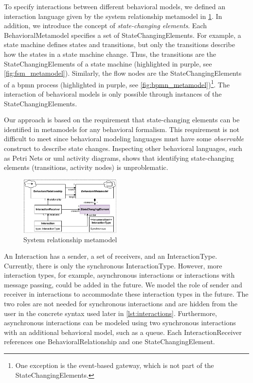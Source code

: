 \documentclass{jot}
\begin{document}
To specify interactions between different behavioral models, we defined an interaction language given by the system relationship metamodel in \cref{fig:srm_metamodel}.
In addition, we introduce the concept of \emph{state-changing elements}.
Each \textsf{BehavioralMetamodel} specifies a set of \textsf{StateChangingElement}s.
For example, a state machine defines states and transitions, but only the transitions describe how the states in a state machine change.
Thus, the transitions are the \textsf{StateChangingElement}s of a state machine (highlighted in purple, see \cref{fig:fsm_metamodel}).
Similarly, the flow nodes are the \textsf{StateChangingElement}s of a \gls*{bpmn} process (highlighted in purple, see \cref{fig:bpmn_metamodel})\footnote{One exception is the event-based gateway, which is not part of the \textsf{StateChangingElement}s.}.
The interaction of behavioral models is only possible through instances of the \textsf{StateChangingElement}s.

Our approach is based on the requirement that state-changing elements can be identified in metamodels for any behavioral formalism.
This requirement is not difficult to meet since behavioral modeling languages must have some \textit{observable} construct to describe state changes.
Inspecting other behavioral languages, such as Petri Nets or \gls*{uml} activity diagrams, shows that identifying state-changing elements (transitions, activity nodes) is unproblematic. 

\begin{figure}[h]
    \centering
    \includegraphics[width=0.45\textwidth]{figures/srm_metamodel.pdf}
    \caption{System relationship metamodel}
    \label{fig:srm_metamodel}
\end{figure}

An \textsf{Interaction} has a \textsf{sender}, a set of \textsf{receivers}, and an \textsf{InteractionType}.
Currently, there is only the \textsf{synchronous} \textsf{InteractionType}.
However, more interaction types, for example, asynchronous interactions or interactions with message passing, could be added in the future.
We model the role of sender and receiver in interactions to accommodate these interaction types in the future.
The two roles are not needed for synchronous interactions and are hidden from the user in the concrete syntax used later in \cref{lst:interactions}.
Furthermore, asynchronous interactions can be modeled using two synchronous interactions with an additional behavioral model, such as a queue.
Each \textsf{InteractionReceiver} references one \textsf{BehavioralRelationship} and one \textsf{StateChangingElement}.
\end{document}
